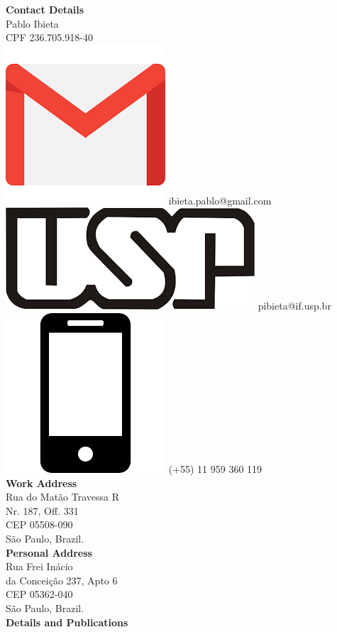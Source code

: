 \documentclass[a4paper,12pt,final]{memoir}
\begin{document}
\begin{flushleft}\small
    \vspace{10mm}
    \textbf{Contact Details}\\
    \vspace{1mm}
	Pablo Ibieta\\
	\vspace{1mm}
	CPF 236.705.918-40 \\
	\vspace{1mm}
    \includegraphics[width=0.07\columnwidth]{gmail_icon.png} ibieta.pablo@gmail.com \\
    \vspace{1mm}
    \includegraphics[width=0.08\columnwidth]{usp_icon.png} pibieta@if.usp.br \\
    \includegraphics[width=0.07\columnwidth]{cellphone_icon.png} (+55) 11 959 360 119 \\	
	\vspace{4mm}
	\textbf{Work Address}\\
	\vspace{1mm}
	Rua do Mat\~ao Travessa R\\
	\vspace{1mm}
	Nr. 187, Off. 331 \\
	\vspace{1mm}
	CEP 05508-090\\
	\vspace{1mm}
	S\~{a}o Paulo, Brazil.\\
	\vspace{4mm}
	\textbf{Personal Address}\\
	\vspace{1mm}
	Rua Frei In\'{a}cio \\
	\vspace{1mm}
	da Concei\c{c}\~{a}o 237, Apto 6 \\
	\vspace{1mm}
	CEP 05362-040 \\
	\vspace{1mm}
	S\~{a}o Paulo, Brazil.\\
	\vspace{4mm}
	\textbf{Details and Publications}\\

\end{flushleft}
\end{document}
